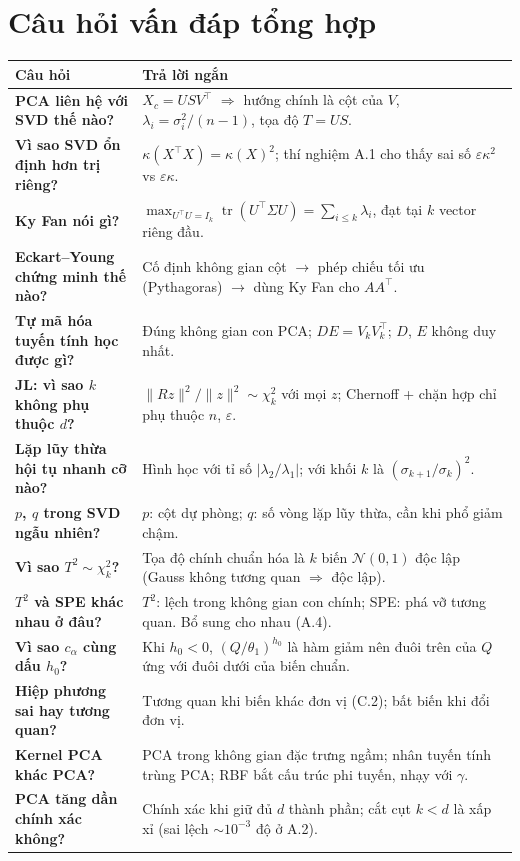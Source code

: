 \documentclass[11pt,a4paper]{article}
\begin{document}
\section{Câu hỏi vấn đáp tổng hợp}
\renewcommand{\arraystretch}{1.3}
\begin{longtable}{@{}>{\raggedright\bfseries}p{5.4cm}p{10.2cm}@{}}
\toprule
Câu hỏi & Trả lời ngắn \\
\midrule
\endhead
PCA liên hệ với SVD thế nào? & $X_c=USV^\top$ $\Rightarrow$ hướng chính là cột của $V$, $\lambda_i=\sigma_i^2/(n-1)$, tọa độ $T=US$. \\
Vì sao SVD ổn định hơn trị riêng? & $\kappa(X^\top X)=\kappa(X)^2$; thí nghiệm A.1 cho thấy sai số $\varepsilon\kappa^2$ vs $\varepsilon\kappa$. \\
Ky Fan nói gì? & $\max_{U^\top U=I_k}\operatorname{tr}(U^\top\Sigma U)=\sum_{i\le k}\lambda_i$, đạt tại $k$ vector riêng đầu. \\
Eckart--Young chứng minh thế nào? & Cố định không gian cột $\to$ phép chiếu tối ưu (Pythagoras) $\to$ dùng Ky Fan cho $AA^\top$. \\
Tự mã hóa tuyến tính học được gì? & Đúng không gian con PCA; $DE=V_kV_k^\top$; $D$, $E$ không duy nhất. \\
JL: vì sao $k$ không phụ thuộc $d$? & $\|Rz\|^2/\|z\|^2\sim\chi^2_k$ với mọi $z$; Chernoff + chặn hợp chỉ phụ thuộc $n$, $\varepsilon$. \\
Lặp lũy thừa hội tụ nhanh cỡ nào? & Hình học với tỉ số $|\lambda_2/\lambda_1|$; với khối $k$ là $(\sigma_{k+1}/\sigma_k)^2$. \\
$p$, $q$ trong SVD ngẫu nhiên? & $p$: cột dự phòng; $q$: số vòng lặp lũy thừa, cần khi phổ giảm chậm. \\
Vì sao $T^2\sim\chi^2_k$? & Tọa độ chính chuẩn hóa là $k$ biến $\mathcal N(0,1)$ độc lập (Gauss không tương quan $\Rightarrow$ độc lập). \\
$T^2$ và SPE khác nhau ở đâu? & $T^2$: lệch trong không gian con chính; SPE: phá vỡ tương quan. Bổ sung cho nhau (A.4). \\
Vì sao $c_\alpha$ cùng dấu $h_0$? & Khi $h_0<0$, $(Q/\theta_1)^{h_0}$ là hàm giảm nên đuôi trên của $Q$ ứng với đuôi dưới của biến chuẩn. \\
Hiệp phương sai hay tương quan? & Tương quan khi biến khác đơn vị (C.2); bất biến khi đổi đơn vị. \\
Kernel PCA khác PCA? & PCA trong không gian đặc trưng ngầm; nhân tuyến tính trùng PCA; RBF bắt cấu trúc phi tuyến, nhạy với $\gamma$. \\
PCA tăng dần chính xác không? & Chính xác khi giữ đủ $d$ thành phần; cắt cụt $k<d$ là xấp xỉ (sai lệch $\sim10^{-3}$ độ ở A.2). \\
\bottomrule
\end{longtable}
\end{document}

